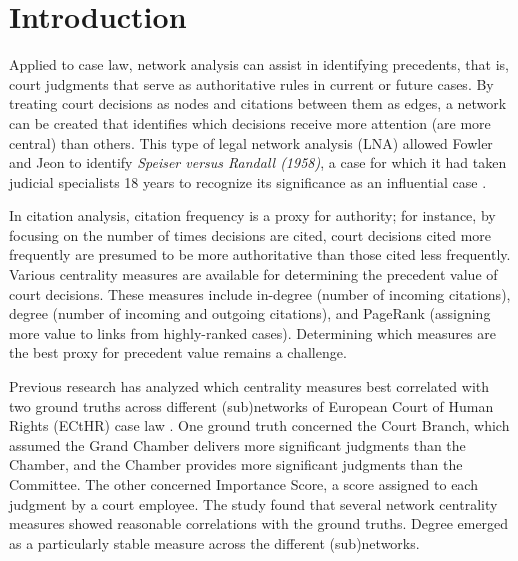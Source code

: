 \documentclass[sigconf,authordraft]{acmart}
\begin{document}

\maketitle

\section{Introduction}
Applied to case law, network analysis can assist in identifying precedents, that is, court judgments that serve as authoritative rules in current or future cases. By treating court decisions as nodes and citations between them as edges, a network can be created that identifies which decisions receive more attention (are more central) than others.
This type of legal network analysis (LNA) allowed Fowler and Jeon to identify \textit{Speiser versus Randall (1958)}, a case for which it had taken judicial specialists 18 years to recognize its significance as an influential case \cite{FOWLER200816}.

In citation analysis, citation frequency is a proxy for authority; for instance, by focusing on the number of times decisions are cited, court decisions cited more frequently are presumed to be more authoritative than those cited less frequently.
Various centrality measures are available for determining the precedent value of court decisions. These measures include in-degree (number of incoming citations), degree (number of incoming and outgoing citations), and PageRank (assigning more value to links from highly-ranked cases). Determining which measures are the best proxy for precedent value remains a challenge.

Previous research has analyzed which centrality measures best correlated with two ground truths across different (sub)networks of European Court of Human Rights (ECtHR) case law \cite{Dijck23}. One ground truth concerned the Court Branch, which assumed the Grand Chamber delivers more significant judgments than the Chamber, and the Chamber provides more significant judgments than the Committee. The other concerned Importance Score, a score assigned to each judgment by a court employee.
The study found that several network centrality measures showed reasonable correlations with the ground truths. Degree emerged as a particularly stable measure across the different (sub)networks.
\end{document}
